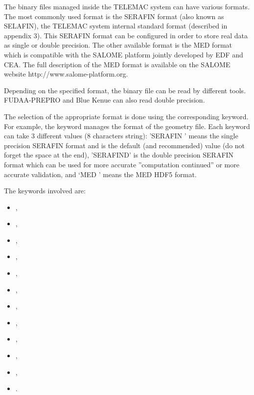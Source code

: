 The binary files managed inside the TELEMAC system can have various formats.
The most commonly used format is the SERAFIN format (also known as SELAFIN),
the TELEMAC system internal standard format (described in appendix 3).
This SERAFIN format can be configured in order to store real data
as single or double precision.
The other available format is the MED format which is compatible with
the SALOME platform jointly developed by EDF and CEA.
The full description of the MED format is available on the SALOME website
http://www.salome-platform.org.

Depending on the specified format, the binary file can be read by different
tools.
FUDAA-PREPRO and Blue Kenue can also read double precision.

The selection of the appropriate format is done using the corresponding keyword.
For example, the keyword  manages the format
of the geometry file.
Each keyword can take 3 different values (8 characters string): 'SERAFIN ' means
the single precision SERAFIN format and is the default (and recommended)
value (do not forget the space at the end),
'SERAFIND' is the double precision SERAFIN format which can be used
for more accurate ''computation continued'' or more accurate validation,
and `MED     ' means the MED HDF5 format.

The keywords involved are:

\begin{itemize}
\item {},

\item {},

\item {},

\item {},

\item {},

\item {},

\item {},

\item {},

\item {},

\item {},

\item {},

\item {}.
\end{itemize}


